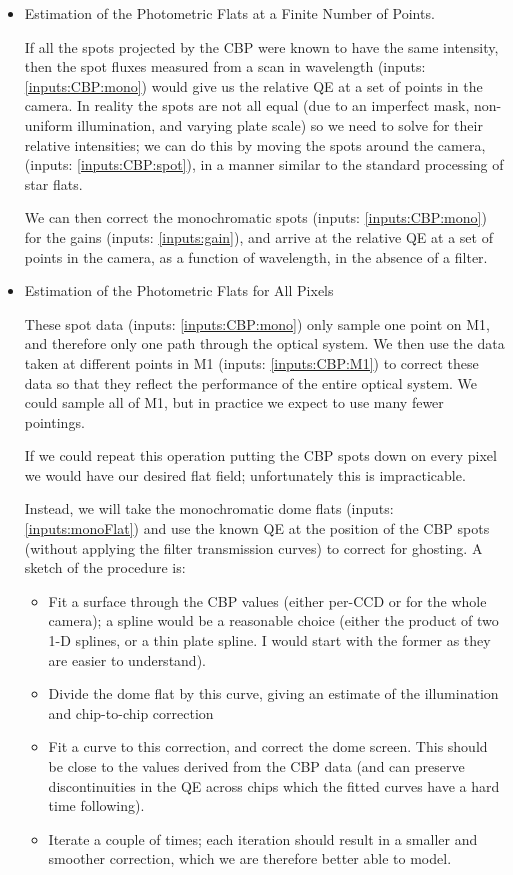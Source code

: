 \documentclass[12pt]{article}
\newcommand{\inputData}[1]{(inputs: \ref{inputs:#1})}
\begin{document}
\begin{itemize}
\item Estimation of the Photometric Flats at a Finite Number of Points.

  If all the spots projected by the CBP were known to have the same intensity, then the spot fluxes measured
  from a scan in wavelength \inputData{CBP:mono} would give us the relative QE at a set of points in the
  camera.  In reality the spots are not all equal (due to an imperfect mask, non-uniform illumination, and
  varying plate scale) so we need to solve for their relative intensities; we can do this by moving the spots
  around the camera, \inputData{CBP:spot}, in a manner similar to the standard processing of star flats.

  We can then correct the monochromatic spots \inputData{CBP:mono} for the gains \inputData{gain}, and arrive
  at the relative QE at a set of points in the camera, as a function of wavelength, in the absence of a
  filter.

\item Estimation of the Photometric Flats for All Pixels

  These spot data \inputData{CBP:mono} only sample one point on M1, and therefore only one path
  through the optical system.  We then use the data taken at different points in M1 \inputData{CBP:M1}
  to correct these data so that they reflect the performance of the entire optical system.  We
  could sample all of M1, but in practice we expect to use many fewer pointings.

  If we could repeat this operation putting the CBP spots down on every pixel we would have our
  desired flat field;  unfortunately this is impracticable.

  Instead, we will take the monochromatic dome flats \inputData{monoFlat} and use the known QE at the position
  of the CBP spots (without applying the filter transmission curves) to correct for ghosting.  A sketch
  of the procedure is:
  \begin{itemize}
  \item Fit a surface through the CBP values (either per-CCD or for the whole camera); a spline would
    be a reasonable choice (either the product of two 1-D splines, or a thin plate spline.  I would
    start with the former as they are easier to understand).
  \item Divide the dome flat by this curve, giving an estimate of the illumination and chip-to-chip
    correction
  \item Fit a curve to this correction, and correct the dome screen.  This should be close to the
    values derived from the CBP data (and can preserve discontinuities in the QE across chips which
    the fitted curves have a hard time following).
  \item Iterate a couple of times;  each iteration should result in a smaller and smoother correction,
    which we are therefore better able to model.
  \end{itemize}


\end{itemize}
\end{document}

